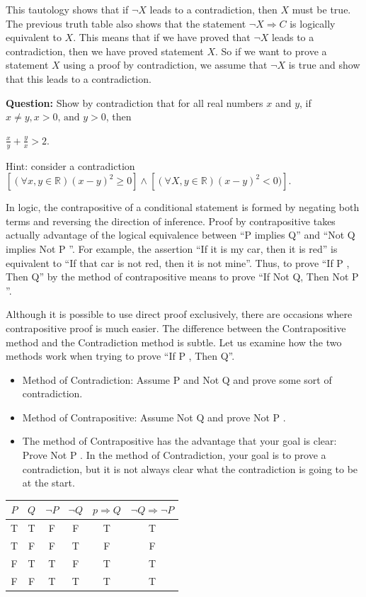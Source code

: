 \documentclass{article}
\begin{document}
This tautology shows that if $\lnot X$ leads to a contradiction, then $X$ must be true. The previous truth table also shows that the statement $\lnot X \Rightarrow C$ is logically equivalent to $X$. This means that if we have proved that $\lnot X$ leads to a contradiction, then we have proved statement $X$. So if we want to prove a statement $X$ using a proof by contradiction, we assume that $\lnot X$ is true and show that this leads to a contradiction.

\begin{tcolorbox}
  \textbf{Question:} Show by contradiction that for all real numbers $x$ and $y$, if $x \neq y , x>0 \text{, and }y>0$, then 
  
  $\frac{x}{y} + \frac{y}{x} > 2$.

  Hint: consider a contradiction $[(\forall x, y \in \mathbb{R})(x-y)^2\geq 0]\land[(\forall X, y \in \mathbb{R})(x-y)^2 < 0)]$.
\end{tcolorbox}

In logic, the contrapositive of a conditional statement is formed by negating both terms and reversing the direction of inference. Proof by contrapositive takes actually advantage of the logical equivalence between “P implies Q” and “Not Q implies Not P ”. For example, the assertion “If it is my car, then it is red” is equivalent to “If that car is not red, then it is not mine”. Thus, to prove “If P , Then Q” by the method of contrapositive means to prove “If Not Q, Then Not P ”.

Although it is possible to use direct proof exclusively, there are occasions where contrapositive proof is much easier. The difference between the Contrapositive method and the Contradiction method is subtle. Let us examine how the two methods work when trying to prove “If P , Then Q”.

\begin{itemize}
  \item Method of Contradiction: Assume P and Not Q and prove some sort of contradiction.
  \item Method of Contrapositive: Assume Not Q and prove Not P .
  \item The method of Contrapositive has the advantage that your goal is clear: Prove Not P . In the method of Contradiction, your goal is to prove a contradiction, but it is not always clear what the contradiction is going to be at the start.
\end{itemize}

\begin{table}
  \begin{center}
    \begin{tabular}{c|c|c|c|c|c}
$P$ & $Q$ & $\lnot P$ & $\lnot Q$ & $p \Rightarrow Q$ & $ \lnot Q \Rightarrow \lnot P$ \\
\hline
T & T & F & F & T & T \\
T & F & F & T & F & F \\
F & T & T & F & T & T \\
F & F & T & T & T & T \\
    \end{tabular}    
  \end{center}
\end{table}
\end{document}
